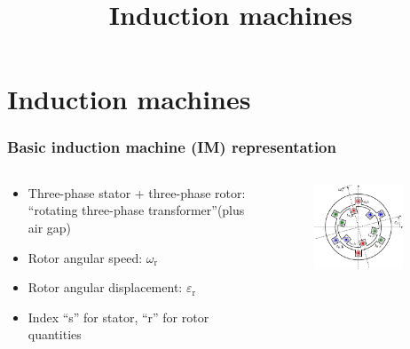 \section{Induction machines}
\title[Induction machines]{Induction machines}  

\begin{frame}[plain]
    \titlepage
\end{frame}

\begin{frame}
	\frametitle{Basic induction machine (IM) representation}
    \begin{columns}
		\begin{column}{0.55\textwidth}
	       \begin{itemize}
            \item Three-phase stator + three-phase rotor: ``rotating three-phase transformer''\newline (plus air gap)
            \item Rotor angular speed: $\omega_\mathrm{r}$
            \item Rotor angular displacement: $\varepsilon_\mathrm{r}$
            \item Index ``s'' for stator, ``r'' for rotor quantities
           \end{itemize}
        \end{column}
        \begin{column}{0.45\textwidth}
            \begin{figure}
                \centering
                \includegraphics[width=0.85\textwidth]{fig/lec06/Simple_three_phase_induction_machine_lumped_coils.pdf}

\end{figure}
\end{column}
\end{columns}
\end{frame}
